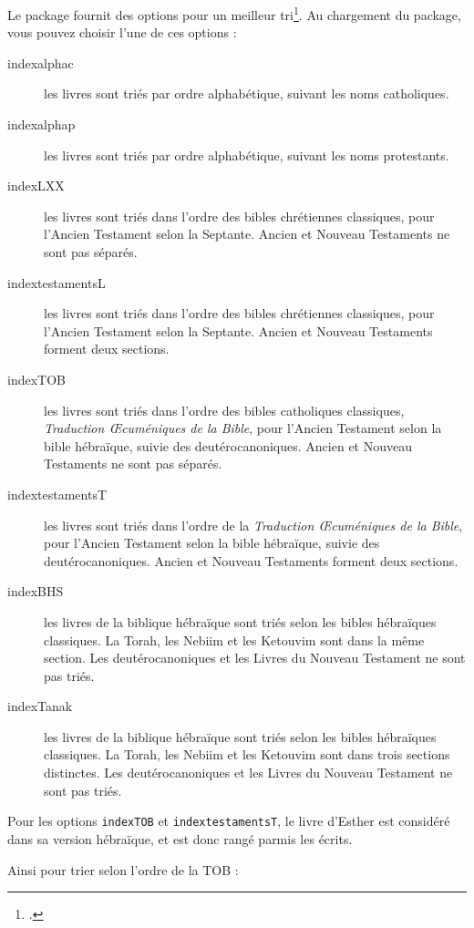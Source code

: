 Le package fournit des options pour un meilleur tri\footcite[Pour l'Ancien Testament les protestants suivent le canon juif pour son contenu mais utilisent l'ordre du canon catholique, voir][]{canons}. Au chargement du package, vous pouvez choisir l'une de ces options :
 \begin{description}
 \item[indexalphac] les livres sont triés par ordre alphabétique, suivant les noms catholiques.
\item[indexalphap] les livres sont triés par ordre alphabétique, suivant les noms protestants.
\item[indexLXX]les livres sont triés dans l'ordre des bibles chrétiennes classiques, pour l'Ancien Testament  selon la Septante. Ancien et Nouveau Testaments ne sont pas séparés.
\item[indextestamentsL] les livres sont triés dans l'ordre des bibles chrétiennes classiques, pour l'Ancien Testament  selon la Septante. Ancien et Nouveau Testaments forment deux sections.
\item[indexTOB] les livres sont triés dans l'ordre des bibles catholiques classiques, \emph{Traduction Œcuméniques de la Bible}, pour l'Ancien Testament  selon la bible hébraïque, suivie des deutérocanoniques. Ancien et Nouveau Testaments ne sont pas séparés.
\item[indextestamentsT] les livres sont triés dans l'ordre de la \emph{Traduction Œcuméniques de la Bible}, pour l'Ancien Testament  selon la bible hébraïque, suivie des deutérocanoniques. Ancien et Nouveau Testaments forment deux sections.
\item[indexBHS] les livres de la biblique hébraïque sont triés selon les bibles hébraïques classiques. La Torah, les Nebiim et les Ketouvim sont dans la même section. Les deutérocanoniques et les Livres du Nouveau Testament ne sont pas triés.
\item[indexTanak] les livres de la biblique hébraïque sont triés selon les bibles hébraïques classiques. La Torah, les Nebiim et les Ketouvim sont dans trois sections distinctes. Les deutérocanoniques et les Livres du Nouveau Testament ne sont pas triés.
\end{description}

Pour les options \verb|indexTOB| et \verb|indextestamentsT|, le livre d'Esther est considéré dans sa version hébraïque, et est donc rangé parmis les  écrits.

Ainsi pour trier selon l'ordre de la TOB : 

\begin{latexcode}
\usepackage[indexTOB]{bibleref-french}
\end{latexcode}


